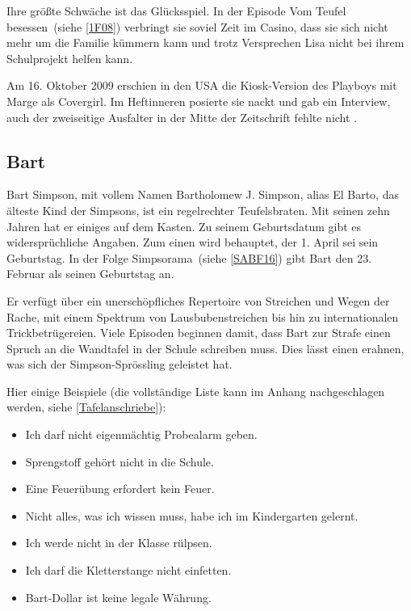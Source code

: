 Ihre größte Schwäche ist das Glücksspiel. In der Episode \glqq Vom Teufel besessen\grqq\ (siehe \ref{1F08}) verbringt sie soviel Zeit im Casino, dass sie sich nicht mehr um die Familie kümmern kann und trotz Versprechen Lisa nicht bei ihrem Schulprojekt helfen kann.

Am 16. Oktober 2009 erschien in den USA die Kiosk-Version des Playboys mit Marge als Covergirl. Im Heftinneren posierte sie nackt und gab ein Interview, auch der zweiseitige Ausfalter in der Mitte der Zeitschrift fehlte nicht \cite{MargePlayboyCover}.


\subsection{Bart}\label{BartSimpson}
Bart Simpson, mit vollem Namen Bartholomew J. Simpson, alias \glqq El Barto\grqq{}, das älteste Kind der Simpsons, ist ein regelrechter Teufelsbraten. Mit seinen zehn Jahren hat er einiges auf dem Kasten. Zu seinem Geburtsdatum gibt es widersprüchliche Angaben. Zum einen wird behauptet, der 1. April sei sein Geburtstag. In der Folge \glqq Simpsorama\grqq\ (siehe \ref{SABF16}) gibt Bart den 23. Februar als seinen Geburtstag an.

Er verfügt über ein unerschöpfliches Repertoire von Streichen und Wegen der Rache, mit einem Spektrum von Lausbubenstreichen bis hin zu internationalen Trickbetrügereien. Viele Episoden beginnen damit, dass Bart zur Strafe einen Spruch an die Wandtafel in der Schule schreiben muss. Dies lässt einen erahnen, was sich der Simpson-Sprössling geleistet hat.

Hier einige Beispiele (die vollständige Liste kann im Anhang nachgeschlagen werden, siehe \ref{Tafelanschriebe}):
\begin{itemize}
	\item Ich darf nicht eigenmächtig Probealarm geben.
	\item Sprengstoff gehört nicht in die Schule.
	\item Eine Feuerübung erfordert kein Feuer.
	\item Nicht alles, was ich wissen muss, habe ich im Kindergarten gelernt.
	\item Ich werde nicht in der Klasse rülpsen.
	\item Ich darf die Kletterstange nicht einfetten.
	\item Bart-Dollar ist keine legale Währung.
\end{itemize}

